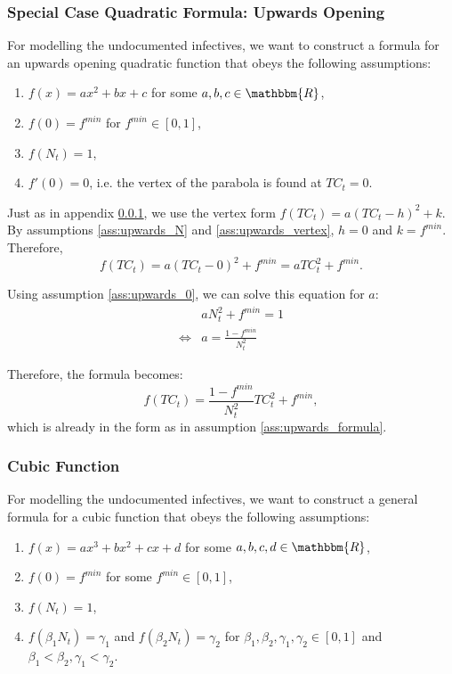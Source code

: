 \documentclass[12pt]{article}
\newcommand{\R}{\mathbbm{R}}
\begin{document}
\begin{appendices}
		\subsubsection{Special Case Quadratic Formula: Upwards Opening} \label{ssapp:upwards_derivation_vertex}
		For modelling the undocumented infectives, we want to construct a formula for an upwards opening quadratic function that obeys the following assumptions:
		\begin{enumerate}[label=(\Roman*)]
		    \item\label{ass:upwards_formula} $f(x) = ax^2 + bx + c$  for some $a, b, c \in \R$,
		    \item\label{ass:upwards_0} $f(0) = f^{min}$ for $f^{min} \in [0,1]$,
		    \item\label{ass:upwards_N} $f(N_t) = 1$,
		    \item\label{ass:upwards_vertex} $f'(0) = 0$, i.e. the vertex of the parabola is found at $TC_t = 0$.
		\end{enumerate}
		
		Just as in appendix \ref{ssapp:upwards_derivation_vertex}, we use the vertex form $f(TC_t) = a(TC_t - h)^2 + k$. By assumptions \ref{ass:upwards_N} and \ref{ass:upwards_vertex}, $h=0$ and $k=f^{min}$. Therefore,
		    \[f(TC_t) = a(TC_t - 0)^2 + f^{min} = aTC_t^2 + f^{min}.\]
		    
		\noindent Using assumption \ref{ass:upwards_0}, we can solve this equation for $a$:
		    \begin{align*}
		             & aN_t^2 + f^{min} = 1\\
		        \iff & a = \frac{1 - f^{min}}{N_t^2}
		    \end{align*}
		    
		\noindent Therefore, the formula becomes:
		    \[f(TC_t) = \frac{1 - f^{min}}{N_t^2}TC_t^2 + f^{min},\]
		which is already in the form as in assumption \ref{ass:upwards_formula}.
		
		\subsubsection{Cubic Function} \label{ssapp:cubic_derivation}
		For modelling the undocumented infectives, we want to construct a general formula for a cubic function that obeys the following assumptions:
		\begin{enumerate}[label=(\Roman*)]
		    \item\label{ass:cubic_formula} $f(x) = ax^3 + bx^2 + cx + d$  for some $a, b, c, d \in \R$,
		    \item\label{ass:cubic_0} $f(0) = f^{min}$ for some $f^{min} \in [0,1]$,
		    \item\label{ass:cubic_N} $f(N_t) = 1$,
		    \item\label{ass:cubic_betaN} $f(\beta_1 N_t) = \gamma_1$ and $f(\beta_2 N_t) = \gamma_2$ for $\beta_1, \beta_2, \gamma_1, \gamma_2 \in [0,1]$ and $\beta_1 < \beta_2, \gamma_1 < \gamma_2$.
		\end{enumerate}
		

\end{appendices}
\end{document}

